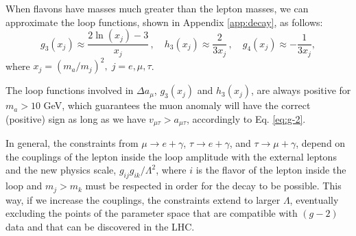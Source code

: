 \documentclass[prd,amsfonts,onecolumn,superscriptaddress,aps,nofootinbib,11pt]{revtex4-1}
\begin{document}
When flavons have masses much greater than the lepton masses, we can approximate the loop functions, shown in Appendix \ref{app:decay}, as follows:
\begin{equation}
    g_3(x_j) \approx \frac{2 \ln(x_j) - 3}{x_j} \,, \quad h_3(x_j) \approx \frac{2}{3x_j} \,, \quad g_4(x_j)\approx -\frac{1}{3x_j},
\end{equation}
where $x_j=(m_a/m_j)^2,\; j=e,\mu,\tau$.

The loop functions involved in $\Delta a_\mu$, $g_3(x_j)$ and $h_3(x_j)$, are always positive for $m_a>10$ GeV, which guarantees the muon anomaly will have the correct (positive) sign as long as we have $v_{\mu \tau} > a_{\mu \tau}$, accordingly to Eq. \eqref{eq:g-2}.

In general, the constraints from $\mu\to e+\gamma$, $\tau\to e+\gamma$, and $\tau\to \mu+\gamma$, depend on the couplings of the lepton inside the loop amplitude with the external leptons and the new physics scale, $g_{ij}g_{ik}/\Lambda^2$, where $i$ is the flavor of the lepton inside the loop and $m_j>m_k$ must be respected in order for the decay to be possible. This way, if we increase the couplings, the constraints extend to larger $\Lambda$, eventually excluding the points of the parameter space that are compatible with $(g-2)$ data and that can be discovered in the LHC.





\end{document}
